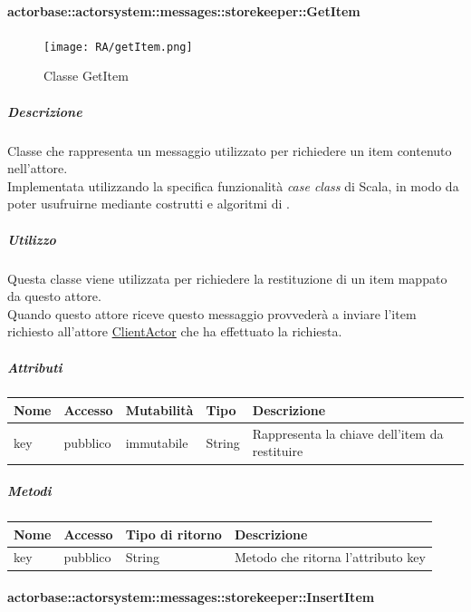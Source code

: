 \documentclass{scalatekids-article}
\begin{document}
\paragraph{actorbase::actorsystem::messages::storekeeper::GetItem}
\label{sec:actorbase::actorsystem::messages::storekeeper::GetItem}

\begin{figure}[H]
  \begin{center}
    \texttt{[image: RA/getItem.png]}
    \caption{Classe GetItem}
  \end{center}
\end{figure}

\subparagraph{Descrizione}
Classe che rappresenta un messaggio utilizzato per richiedere un item
contenuto nell'attore.\\Implementata utilizzando la specifica funzionalità \textit{case class} di Scala,
in modo da poter usufruirne mediante costrutti e algoritmi di
.

\subparagraph{Utilizzo}
Questa classe viene utilizzata per richiedere la restituzione di un
item mappato da questo attore.\\Quando questo attore riceve questo
messaggio provvederà a inviare l'item richiesto all'attore \hyperref[sec:actorbase::actorsystem::actors::clientactor::ClientActor]{ClientActor} che
ha effettuato la richiesta.

\subparagraph{Attributi}
\begin{tabular}{| p{2cm} | p{1.5cm} | p{2cm} | p{3cm} | p{8.5cm} |}
  \hline
  Nome & Accesso & Mutabilità & Tipo & Descrizione\\
  \hline
  key & pubblico & immutabile & String & Rappresenta la chiave dell'item da restituire\\
  \hline
\end{tabular}

\subparagraph{Metodi}
\begin{tabular}{| p{3cm} | p{1.5cm} | p{3.5cm} | p{9cm} |}
  \hline
  Nome & Accesso & Tipo di ritorno & Descrizione\\
  \hline
  key & pubblico & String & Metodo che ritorna l'attributo key\\
  \hline
\end{tabular}

\paragraph{actorbase::actorsystem::messages::storekeeper::InsertItem}
\label{sec:actorbase::actorsystem::messages::storekeeper::InsertItem}
\end{document}
